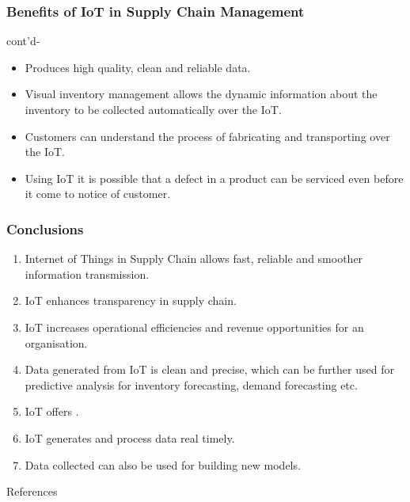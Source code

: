 \documentclass{beamer}
\begin{document}
\begin{frame}
\frametitle{Benefits of IoT in Supply Chain Management}
\begin{block}{cont'd-}
\begin{itemize}
	\item Produces high quality, clean and reliable data.
    \item Visual inventory management allows the dynamic information about the inventory to be collected automatically over the IoT.
    \item Customers can understand the process of fabricating and transporting over the IoT.\cite{lou2011agile}
    \item Using IoT it is possible that a defect in a product can be serviced even before it come to notice of customer.    
\end{itemize}
\end{block}
\end{frame}

\begin{frame}
\frametitle{Conclusions}
\begin{enumerate}
	\item Internet of Things in Supply Chain allows fast, reliable and smoother information transmission.
	\item IoT enhances transparency in supply chain.
	\item IoT increases operational efficiencies and revenue opportunities for an organisation.
	\item Data generated from IoT is clean and precise, which can be further used for predictive analysis for inventory forecasting, demand forecasting etc.\cite{lancioni2000role}
	\item IoT offers .
	\item IoT generates and process data real timely.
	\item Data collected can also be used for building new models.\cite{yan2009supply}
\end{enumerate}
\end{frame}



\begin{frame}[t, allowframebreaks]{References}
	

	

\end{frame}
\end{document}
